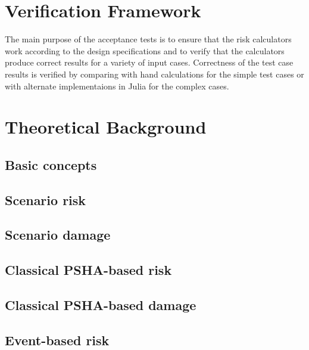 \section{Verification Framework}
The main purpose of the acceptance tests is to ensure that the risk calculators work according to the design specifications and to verify that the calculators produce correct results for a variety of input cases. Correctness of the test case results is verified by comparing with hand calculations for the simple test cases or with alternate implementaions in Julia for the complex cases.

\section{Theoretical Background}
\subsection{Basic concepts}
   \label{subsec:theory-basic-concepts}
   
\subsection{Scenario risk}
   \label{subsec:theory-scenario-risk}
   
\subsection{Scenario damage}
   \label{subsec:theory-scenario-damage}
   
\subsection{Classical PSHA-based risk}
   \label{subsec:theory-classical-risk}
   
\subsection{Classical PSHA-based damage}
   \label{subsec:theory-classical-damage}
   
\subsection{Event-based risk}
   \label{subsec:theory-eventbased}
   
   \cleardoublepage